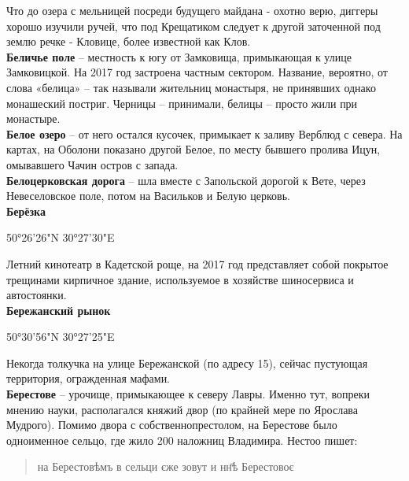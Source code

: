 Что до озера с мельницей посреди будущего майдана - охотно верю, диггеры хорошо изучили ручей, что под Крещатиком следует к другой заточенной под землю речке - Кловице, более известной как Клов.\\

\textbf{Беличье поле} – местность к югу от Замковища, примыкающая к улице Замковицкой. На 2017 год застроена частным сектором. Название, вероятно, от слова «белица» – так называли жительниц монастыря, не принявших однако монашеский постриг. Черницы – принимали, белицы – просто жили при монастыре.\\





\textbf{Белое озеро} – от него остался кусочек, примыкает к заливу Верблюд с севера. На картах, на Оболони показано другой Белое, по месту бывшего пролива Ицун, омывавшего Чачин остров с запада.\\

\textbf{Белоцерковская дорога} – шла вместе с Запольской дорогой к Вете, через Невеселовское поле, потом на Васильков и Белую церковь.\\

\textbf{Берёзка} 

50°26'26"N 30°27'30"E

Летний кинотеатр в Кадетской роще, на 2017 год представляет собой покрытое трещинами кирпичное здание, используемое в хозяйстве шиносервиса и автостоянки.\\

\textbf{Бережанский рынок}

50°30'56"N 30°27'25"E

Некогда толкучка на улице Бережанской (по адресу 15), сейчас пустующая территория, огражденная мафами.\\

\textbf{Берестове} – урочище, примыкающее к северу Лавры. Именно тут, вопреки мнению науки, располагался княжий двор (по крайней мере по Ярослава Мудрого). Помимо двора с собственнопрестолом, на Берестове было одноименное сельцо, где жило 200 наложниц Владимира. Нестоо пишет:

\begin{quotation}
на Берестовѣмъ в сельци єже зовут и нн҃ѣ Берестовоє
\end{quotation}

